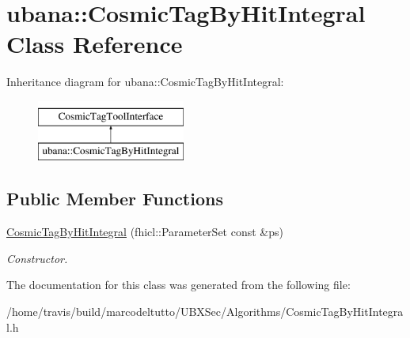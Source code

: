 \hypertarget{classubana_1_1CosmicTagByHitIntegral}{\section{ubana\-:\-:\-Cosmic\-Tag\-By\-Hit\-Integral \-Class \-Reference}
\label{classubana_1_1CosmicTagByHitIntegral}
}
\-Inheritance diagram for ubana\-:\-:\-Cosmic\-Tag\-By\-Hit\-Integral\-:\begin{figure}[H]
\begin{center}
\leavevmode
\includegraphics[height=2.000000cm]{classubana_1_1CosmicTagByHitIntegral}
\end{center}
\end{figure}
\subsection*{\-Public \-Member \-Functions}
\begin{DoxyCompactItemize}
\item 
\hypertarget{classubana_1_1CosmicTagByHitIntegral_ae58970463cfcb6fa697e19073da6a91c}{\hyperlink{classubana_1_1CosmicTagByHitIntegral_ae58970463cfcb6fa697e19073da6a91c}{\-Cosmic\-Tag\-By\-Hit\-Integral} (fhicl\-::\-Parameter\-Set const \&ps)}\label{classubana_1_1CosmicTagByHitIntegral_ae58970463cfcb6fa697e19073da6a91c}

\begin{DoxyCompactList}\small\item\em \-Constructor. \end{DoxyCompactList}\end{DoxyCompactItemize}


\-The documentation for this class was generated from the following file\-:\begin{DoxyCompactItemize}
\item 
/home/travis/build/marcodeltutto/\-U\-B\-X\-Sec/\-Algorithms/\-Cosmic\-Tag\-By\-Hit\-Integral.\-h\end{DoxyCompactItemize}
